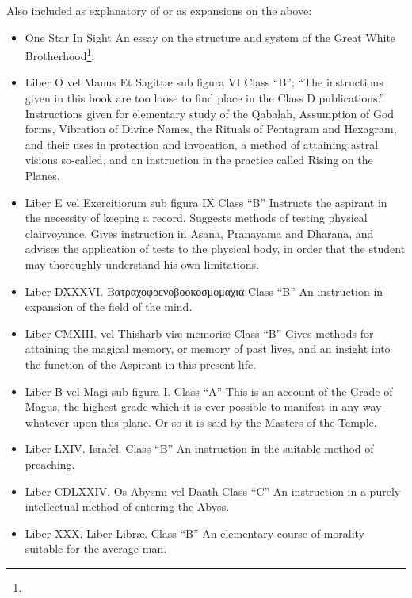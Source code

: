 \begin{samepage}
Also included as explanatory of or as expansions on the above: \begin{itemize}
\item One Star In Sight \textemdash{} An essay on the structure and system of the Great White Brotherhood\footnote{\Argentium{}}.
\item Liber O vel Manus Et Sagitt\ae{} sub figura VI \textemdash{} Class \enquote{B}; \enquote{The instructions given in this book are too loose to find place in the Class D publications.} \textemdash{} Instructions given for elementary study of the Qabalah, Assumption of God forms, Vibration of Divine Names, the Rituals of Pentagram and Hexagram, and their uses in protection and invocation, a method of attaining astral visions so-called, and an instruction in the practice called Rising on the Planes.
\item Liber E vel Exercitiorum sub figura IX \textemdash{} Class \enquote{B} \textemdash{} Instructs the aspirant in the necessity of keeping a record. Suggests methods of testing physical clairvoyance. Gives instruction in Asana, Pranayama and Dharana, and advises the application of tests to the physical body, in order that the student may thoroughly understand his own limitations.
\item Liber DXXXVI. \textgreek{Βατραχοφρενοβοοκοσμομαχια} \textemdash{} Class \enquote{B} \textemdash{} An instruction in expansion of the field of the mind.
\item Liber CMXIII.  vel Thisharb vi\ae{}{} memori\ae{}{} \textemdash{} Class \enquote{B} \textemdash{} Gives methods for attaining the magical memory, or memory of past lives, and an insight into the function of the Aspirant in this present life.
\item Liber B vel Magi sub figura I. \textemdash{} Class \enquote{A} \textemdash{} This is an account of the Grade of Magus, the highest grade which it is ever possible to manifest in any way whatever upon this plane. Or so it is said by the Masters of the Temple.
\item Liber LXIV. Israfel. \textemdash{} Class \enquote{B} \textemdash{} An instruction in the suitable method of preaching.
\item Liber CDLXXIV. Os Abysmi vel Daath \textemdash{} Class \enquote{C} \textemdash{} An instruction in a purely intellectual method of entering the Abyss.
\item Liber XXX. Liber Libr\ae{}. \textemdash{} Class \enquote{B} \textemdash{} An elementary course of morality suitable for the average man.
\end{itemize}
\end{samepage}
